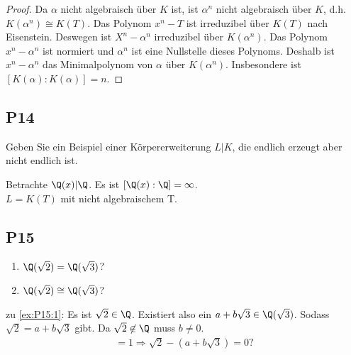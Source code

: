 \begin{proof}
	Da $\alpha$ nicht algebraisch über $K$ ist, ist $\alpha^n$ nicht algebraisch über $K$, d.h. $K(\alpha^n) \cong K(T)$. Das Polynom $x^n - T$ ist irreduzibel über $K(T)$ nach Eisenstein. Deswegen ist $X^n - \alpha^n$ irreduzibel über $K(\alpha^n)$. Das Polynom $x^n - \alpha^n$ ist normiert und $\alpha^n$ ist eine Nullstelle dieses Polynoms. Deshalb ist $x^n - \alpha^n$ das Minimalpolynom von $\alpha$ über $K(\alpha^n)$. Insbesondere ist $[K(\alpha):K(\alpha)] = n$.
\end{proof}


\subsection{P14}
Geben Sie ein Beispiel einer Körpererweiterung $L\vert K$, die endlich erzeugt aber nicht endlich ist.

\begin{lösung}
	Betrachte $\Q(x)\vert \Q$. Es ist $[\Q(x):\Q] = \infty$.\\
	$L = K(T)$ mit nicht algebraischem T.
\end{lösung}


\subsection{P15}
\begin{enumerate}
	\item $\Q(\sqrt{2}) = \Q(\sqrt{3})$? \label{ex:P15:1}
	\item $\Q(\sqrt{2}) \cong \Q(\sqrt{3})$? \label{ex:P15:2}
\end{enumerate}

\begin{lösung}
	zu \ref{ex:P15:1}: Es ist $\sqrt{2} \in \Q$. Existiert also ein $a+b\sqrt{3} \in \Q(\sqrt{3})$. Sodass $\sqrt{2} = a + b\sqrt{3}$ gibt. Da $\sqrt{2} \not\in \Q$ muss $b \neq 0$.
	\begin{align*}
		[\Q(\sqrt{2}):\Q(\sqrt{3})] = 1 \Rightarrow \sqrt{2} - (a+b\sqrt{3}) = 0\text{?}
	\end{align*}
	
\end{lösung}

%

